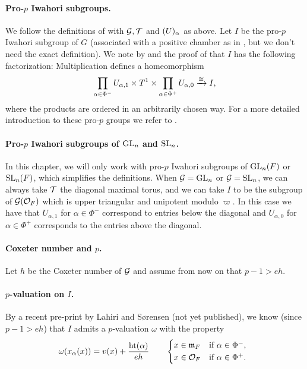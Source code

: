 \paragraph{Pro-$p$ Iwahori subgroups.} We follow the definitions of \cite{SchOll-modular} with $\mathcal{G}, \mathcal{T}$ and $\mathcal{(}U)_{\alpha}$ as above. Let $I$ be the pro-$p$ Iwahori subgroup of $G$ (associated with a positive chamber as in \cite{SchOll-modular}, but we don't need the exact definition). We note by \cite[Lem.~2.1(i)]{SchOll-modular} and the proof of \cite[Lem.~2.3]{SchOll-modular} that $I$ has the following factorization: Multiplication defines a homeomorphism
\begin{equation*}
  \prod_{\alpha \in \Phi^{-}} U_{\alpha,1} \times T^{1} \times \prod_{\alpha \in \Phi^{+}} U_{\alpha,0} \xrightarrow{\cong} I,
\end{equation*}
where the products are ordered in an arbitrarily chosen way. For a more detailed introduction to these pro-$p$ groups we refer to \cite{SchOll-modular}.

\paragraph{Pro-$p$ Iwahori subgroups of $\operatorname{GL}_{n}$ and $\operatorname{SL}_{n}$.} In this chapter, we will only work with pro-$p$ Iwahori subgroups of $\operatorname{GL}_{n}(F)$ or $\operatorname{SL}_{n}(F)$, which simplifies the definitions. When $\mathcal{G} = \operatorname{GL}_{n}$ or $\mathcal{G} = \operatorname{SL}_{n}$, we can always take $\mathcal{T}$ the diagonal maximal torus, and we can take $I$ to be the subgroup of $\mathcal{G}(\mathcal{O}_{F})$ which is upper triangular and unipotent modulo $\varpi$. In this case we have that $U_{\alpha,1}$ for $\alpha \in \Phi^{-}$ correspond to entries below the diagonal and $U_{\alpha,0}$ for $\alpha \in \Phi^{+}$ corresponds to the entries above the diagonal.

\paragraph{Coxeter number and $p$.} Let $h$ be the Coxeter number of $\mathcal{G}$ and assume from now on that $p-1 > eh$.

\paragraph{$p$-valuation on $I$.} By a recent pre-print by Lahiri and Sørensen (not yet published), we know (since $p-1 > eh$) that $I$ admits a $p$-valuation $\omega$ with the property
\begin{equation}\label{eq:Iwa-p-val}
  \omega(x_{\alpha}(x)) = v(x) + \frac{\Ht(\alpha)}{eh} \qquad
  \begin{dcases*}
    x \in \idm_{F} & if $\alpha \in \Phi^{-}$, \\
    x \in \sO_{F} & if $\alpha \in \Phi^{+}$.
  \end{dcases*}
\end{equation}

